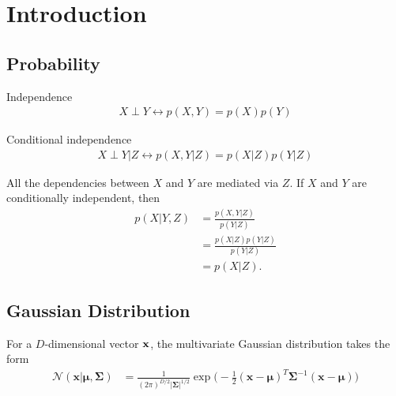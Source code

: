 \chapter{Introduction}
\section{Probability}



\begin{definition}{Independence}\vspace{-0.5cm}
	\begin{align*}
	X\perp Y \leftrightarrow p(X,Y)=p(X)p(Y)
	\end{align*}
\end{definition}
\begin{definition}{Conditional independence}\vspace{-0.5cm}
	\begin{align*}
	X\perp Y|Z \leftrightarrow p(X,Y|Z)=p(X|Z)p(Y|Z)
	\end{align*}
\end{definition}
All the dependencies between $X$ and $Y$ are mediated via $Z$. If $X$ and $Y$ are conditionally independent, then 
\begin{align*}
	p(X|Y,Z)&=\frac{p(X,Y|Z)}{p(Y|Z)}\\
	&=\frac{p(X|Z)p(Y|Z)}{p(Y|Z)}\\
	&=p(X|Z).
\end{align*}

\section{Gaussian Distribution}
For a $D$-dimensional vector ${\mathbf{x}}$, the multivariate Gaussian distribution takes the form
\begin{align*}
	\mathcal{N}(\mathbf{x}|\boldsymbol{\mu},\boldsymbol{\Sigma}) &= \frac{1}{(2\pi)^{D/2}|\boldsymbol{\Sigma}|^{1/2}}\exp\bigg(-\frac{1}{2}(\mathbf{x}-\boldsymbol{\mu})^T\boldsymbol{\Sigma}^{-1}(\mathbf{x}-\boldsymbol{\mu})\bigg)\\
\end{align*}






